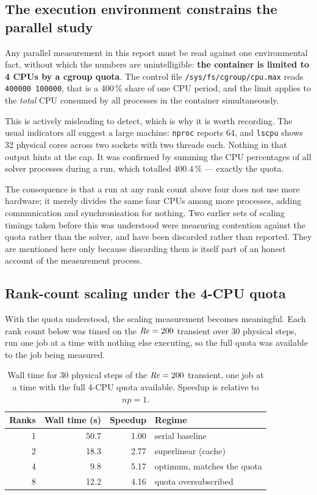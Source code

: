 \subsection{The execution environment constrains the parallel study}
\label{sec:quota}

Any parallel measurement in this report must be read against one environmental
fact, without which the numbers are unintelligible: \textbf{the container is
limited to 4 CPUs by a cgroup quota}. The control file
\texttt{/sys/fs/cgroup/cpu.max} reads \texttt{400000 100000}, that is a 400\,\%
share of one CPU period, and the limit applies to the \emph{total} CPU consumed by
all processes in the container simultaneously.

This is actively misleading to detect, which is why it is worth recording. The
usual indicators all suggest a large machine: \texttt{nproc} reports 64, and
\texttt{lscpu} shows 32 physical cores across two sockets with two threads each.
Nothing in that output hints at the cap. It was confirmed by summing the CPU
percentages of all solver processes during a run, which totalled $400.4\,\%$ ---
exactly the quota.

The consequence is that a run at any rank count above four does not use more
hardware; it merely divides the same four CPUs among more processes, adding
communication and synchronisation for nothing. Two earlier sets of scaling timings
taken before this was understood were measuring contention against the quota
rather than the solver, and have been discarded rather than reported. They are
mentioned here only because discarding them is itself part of an honest account of
the measurement process.

\subsection{Rank-count scaling under the 4-CPU quota}
\label{sec:rankchoice}

With the quota understood, the scaling measurement becomes meaningful. Each rank
count below was timed on the $\mathit{Re}=200$ transient over 30 physical steps, run
one job at a time with nothing else executing, so the full quota was available to
the job being measured.

\begin{table}[htbp]
  \centering
  \caption{Wall time for 30 physical steps of the $\mathit{Re}=200$ transient, one job
  at a time with the full 4-CPU quota available. Speedup is relative to $np=1$.}
  \label{tab:rankchoice}
  \small
  \begin{tabular}{rrrl}
    \toprule
    Ranks & Wall time (s) & Speedup & Regime \\
    \midrule
    1 & 50.7 & 1.00 & serial baseline \\
    2 & 18.3 & 2.77 & superlinear (cache) \\
    4 & 9.8 & 5.17 & optimum, matches the quota \\
    8 & 12.2 & 4.16 & quota oversubscribed \\
    \bottomrule
  \end{tabular}
\end{table}

